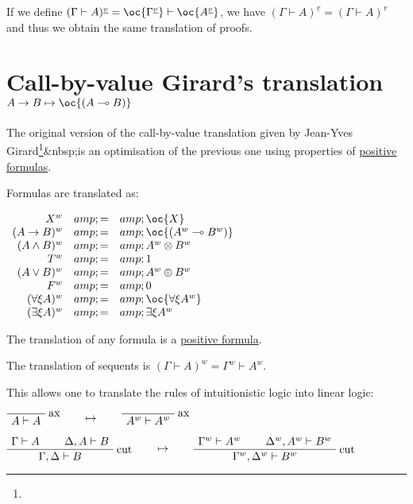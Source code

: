 If we define
\((\Gamma\vdash A)^{\underline{v}} = \oc{\Gamma^{\underline{v}}}\vdash\oc{A^{\underline{v}}}\),
we have \((\Gamma\vdash A)^{\underline{v}} = (\Gamma\vdash A)^v\) and
thus we obtain the same translation of proofs.

\section{\texorpdfstring{Call-by-value Girard's translation \(A\imp B \mapsto \oc{(A\limp B)}\)}{Call-by-value Girard's translation A\textbackslash{}imp B \textbackslash{}mapsto \textbackslash{}oc\{(A\textbackslash{}limp B)\}}}\label{call-by-value-girards-translation-aimp-b-mapsto-ocalimp-b}

The original version of the call-by-value translation given by Jean-Yves
Girard\footnote{}\&nbsp;is an optimisation of the previous one using
properties of \href{positive_formula}{positive formulas}.

Formulas are translated as:

\(\begin{array}{rcl}
X^w &amp; = &amp; \oc{X} \\
(A\imp B)^w &amp; = &amp; \oc{(A^w\limp B^w)} \\
(A\wedge B)^w &amp; = &amp; A^w \tens B^w \\
T^w &amp; = &amp; \one \\
(A\vee B)^w &amp; = &amp; A^w\plus B^w \\
F^w &amp; = &amp; \zero \\
(\forall\xi A)^w &amp; = &amp; \oc{\forall\xi A^w} \\
(\exists\xi A)^w &amp; = &amp; \exists\xi A^w
\end{array}\)

The translation of any formula is a \href{positive_formula}{positive
formula}.

The translation of sequents is
\((\Gamma\vdash A)^w = \Gamma^w\vdash A^w\).

This allows one to translate the rules of intuitionistic logic into
linear logic:

\(\LabelRule{\rulename{ax}}
\NulRule{A\vdash A}
\DisplayProof
\qquad\mapsto\qquad
\LabelRule{\rulename{ax}}
\NulRule{A^w\vdash A^w}
\DisplayProof\)

\(\AxRule{\Gamma\vdash A}
\AxRule{\Delta,A\vdash B}
\LabelRule{\rulename{cut}}
\BinRule{\Gamma,\Delta\vdash B}
\DisplayProof
\qquad\mapsto\qquad
\AxRule{\Gamma^w\vdash A^w}
\AxRule{\Delta^w,A^w\vdash B^w}
\LabelRule{\rulename{cut}}
\BinRule{\Gamma^w,\Delta^w\vdash B^w}
\DisplayProof\)

